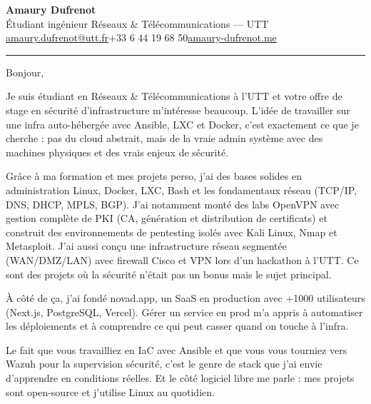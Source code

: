 \documentclass[a4paper, 10.5pt]{article}
\newcommand{\headingfont}{\fontfamily{Raleway-TLF}\selectfont}
\begin{document}
\color{bodytext}

\begin{center}
{\headingfont\fontsize{20}{24}\selectfont\bfseries\color{titletext}Amaury Dufrenot}\\[4pt]
{\small\color{mutedtext}Étudiant ingénieur Réseaux \& Télécommunications — UTT}\\[6pt]
{\small\color{mutedtext}\href{mailto:amaury.dufrenot@utt.fr}{amaury.dufrenot@utt.fr}\hspace{6pt}{\color{sep}\textbar}\hspace{6pt}+33 6 44 19 68 50\hspace{6pt}{\color{sep}\textbar}\hspace{6pt}\href{https://amaury-dufrenot.me}{amaury-dufrenot.me}}\\[8pt]
{\color{accent}\rule{0.35\textwidth}{0.8pt}}
\end{center}

\vspace{6mm}

Bonjour,

Je suis étudiant en Réseaux \& Télécommunications à l'UTT et votre offre de stage en sécurité d'infrastructure m'intéresse beaucoup. L'idée de travailler sur une infra auto-hébergée avec Ansible, LXC et Docker, c'est exactement ce que je cherche : pas du cloud abstrait, mais de la vraie admin système avec des machines physiques et des vrais enjeux de sécurité.

Grâce à ma formation et mes projets perso, j'ai des bases solides en administration Linux, Docker, LXC, Bash et les fondamentaux réseau (TCP/IP, DNS, DHCP, MPLS, BGP). J'ai notamment monté des labs OpenVPN avec gestion complète de PKI (CA, génération et distribution de certificats) et construit des environnements de pentesting isolés avec Kali Linux, Nmap et Metasploit. J'ai aussi conçu une infrastructure réseau segmentée (WAN/DMZ/LAN) avec firewall Cisco et VPN lors d'un hackathon à l'UTT. Ce sont des projets où la sécurité n'était pas un bonus mais le sujet principal.

À côté de ça, j'ai fondé novad.app, un SaaS en production avec +1000 utilisateurs (Next.js, PostgreSQL, Vercel). Gérer un service en prod m'a appris à automatiser les déploiements et à comprendre ce qui peut casser quand on touche à l'infra.

Le fait que vous travailliez en IaC avec Ansible et que vous vous tourniez vers Wazuh pour la supervision sécurité, c'est le genre de stack que j'ai envie d'apprendre en conditions réelles. Et le côté logiciel libre me parle : mes projets sont open-source et j'utilise Linux au quotidien.
\end{document}
